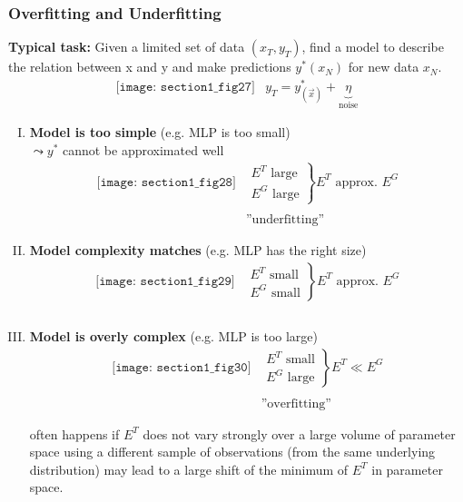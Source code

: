 \subsubsection{Overfitting and Underfitting}
\textbf{Typical task:} Given a limited set of data $(x_T,y_T)$, find a model to describe the relation between x and y and make predictions $y^*(x_N)$ for new data $x_N$. 
\[ \begin{array}{ll}
	\texttt{[image: section1\_fig27]}
	& y_T = y_{(\vec{x})}^* + \underbrace{\eta}_{\text{noise}}
\end{array} \]

\begin{enumerate}[I.]
\item {\bf Model is too simple} (e.g. MLP is too small)\\
\indent $\leadsto y^*$ cannot be approximated well
\[ \begin{array}{ll}
	\texttt{[image: section1\_fig28]}
	& \left. \begin{array}{l}
		E^T \text{ large} \\
		E^G \text{ large}
	\end{array} \right \} E^T \text{ approx. } E^G \\\\
	& \text{''underfitting''}
\end{array} \]
\item{\bf Model complexity matches} (e.g. MLP has the right size)
\[ \begin{array}{ll}
	\texttt{[image: section1\_fig29]}
	& \left. \begin{array}{l}
		E^T \text{ small} \\
		E^G \text{ small}
	\end{array} \right \} E^T \text{ approx. } E^G \\\\
\end{array} \]
\item {\bf Model is overly complex} (e.g. MLP is too large)
\[ \begin{array}{ll}
	\texttt{[image: section1\_fig30]}
	& \left. \begin{array}{l}
		E^T \text{ small} \\
		E^G \text{ large}
	\end{array} \right \} E^T \ll E^G \\\\
	& \text{''overfitting''}
\end{array} \]
\begin{itemize}
	\itR often happens if $E^T$ does not vary strongly over a large volume 
		of parameter space
	\itR using a different sample of observations (from the same underlying 
		distribution) may lead to a large shift of the minimum of $E^T$ 
		in parameter space.
\end{itemize}
\end{enumerate}

